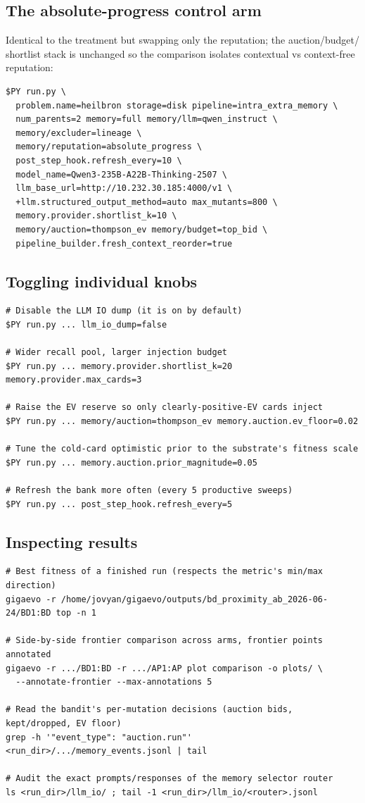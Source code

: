 \documentclass[11pt]{article}
\begin{document}
\subsection{The absolute-progress control arm}
Identical to the treatment but swapping only the reputation; the auction/budget/
shortlist stack is unchanged so the comparison isolates contextual vs context-free
reputation:
\begin{lstlisting}
$PY run.py \
  problem.name=heilbron storage=disk pipeline=intra_extra_memory \
  num_parents=2 memory=full memory/llm=qwen_instruct \
  memory/excluder=lineage \
  memory/reputation=absolute_progress \
  post_step_hook.refresh_every=10 \
  model_name=Qwen3-235B-A22B-Thinking-2507 \
  llm_base_url=http://10.232.30.185:4000/v1 \
  +llm.structured_output_method=auto max_mutants=800 \
  memory.provider.shortlist_k=10 \
  memory/auction=thompson_ev memory/budget=top_bid \
  pipeline_builder.fresh_context_reorder=true
\end{lstlisting}

\subsection{Toggling individual knobs}
\begin{lstlisting}
# Disable the LLM IO dump (it is on by default)
$PY run.py ... llm_io_dump=false

# Wider recall pool, larger injection budget
$PY run.py ... memory.provider.shortlist_k=20 memory.provider.max_cards=3

# Raise the EV reserve so only clearly-positive-EV cards inject
$PY run.py ... memory/auction=thompson_ev memory.auction.ev_floor=0.02

# Tune the cold-card optimistic prior to the substrate's fitness scale
$PY run.py ... memory.auction.prior_magnitude=0.05

# Refresh the bank more often (every 5 productive sweeps)
$PY run.py ... post_step_hook.refresh_every=5
\end{lstlisting}

\subsection{Inspecting results}
\begin{lstlisting}
# Best fitness of a finished run (respects the metric's min/max direction)
gigaevo -r /home/jovyan/gigaevo/outputs/bd_proximity_ab_2026-06-24/BD1:BD top -n 1

# Side-by-side frontier comparison across arms, frontier points annotated
gigaevo -r .../BD1:BD -r .../AP1:AP plot comparison -o plots/ \
  --annotate-frontier --max-annotations 5

# Read the bandit's per-mutation decisions (auction bids, kept/dropped, EV floor)
grep -h '"event_type": "auction.run"' <run_dir>/.../memory_events.jsonl | tail

# Audit the exact prompts/responses of the memory selector router
ls <run_dir>/llm_io/ ; tail -1 <run_dir>/llm_io/<router>.jsonl
\end{lstlisting}
\end{document}

